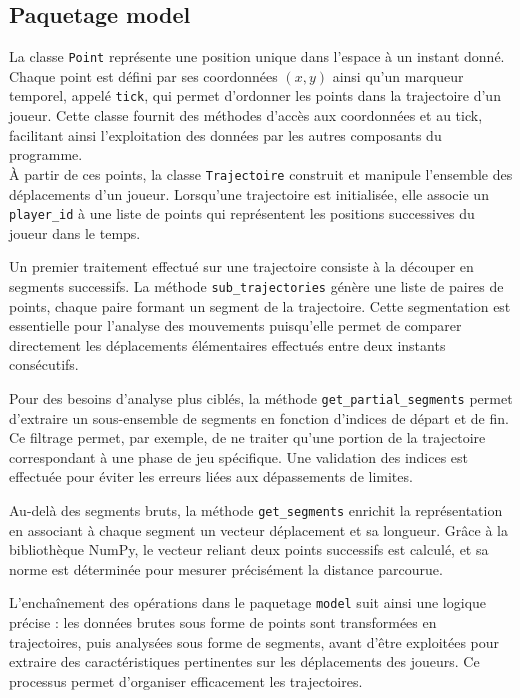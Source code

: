 \documentclass{article}
\begin{document}
       \subsection{Paquetage model}
        La classe \texttt{Point} représente une position unique dans l'espace à un instant donné. Chaque point est défini par ses coordonnées $(x, y)$ ainsi qu’un marqueur temporel, appelé \texttt{tick}, qui permet d’ordonner les points dans la trajectoire d’un joueur. Cette classe fournit des méthodes d'accès aux coordonnées et au tick, facilitant ainsi l’exploitation des données par les autres composants du programme.\\
        
        À partir de ces points, la classe \texttt{Trajectoire} construit et manipule l’ensemble des déplacements d’un joueur. Lorsqu’une trajectoire est initialisée, elle associe un \texttt{player\_id} à une liste de points qui représentent les positions successives du joueur dans le temps.
        
        Un premier traitement effectué sur une trajectoire consiste à la découper en segments successifs. La méthode \texttt{sub\_trajectories} génère une liste de paires de points, chaque paire formant un segment de la trajectoire. Cette segmentation est essentielle pour l’analyse des mouvements puisqu’elle permet de comparer directement les déplacements élémentaires effectués entre deux instants consécutifs.  
        
        Pour des besoins d’analyse plus ciblés, la méthode \texttt{get\_partial\_segments} permet d’extraire un sous-ensemble de segments en fonction d’indices de départ et de fin. Ce filtrage permet, par exemple, de ne traiter qu’une portion de la trajectoire correspondant à une phase de jeu spécifique. Une validation des indices est effectuée pour éviter les erreurs liées aux dépassements de limites.  
        
        Au-delà des segments bruts, la méthode \texttt{get\_segments} enrichit la représentation en associant à chaque segment un vecteur déplacement et sa longueur. Grâce à la bibliothèque NumPy, le vecteur reliant deux points successifs est calculé, et sa norme est déterminée pour mesurer précisément la distance parcourue. 
        
        L’enchaînement des opérations dans le paquetage \texttt{model} suit ainsi une logique précise : les données brutes sous forme de points sont transformées en trajectoires, puis analysées sous forme de segments, avant d’être exploitées pour extraire des caractéristiques pertinentes sur les déplacements des joueurs. Ce processus permet d’organiser efficacement les trajectoires.
        
\end{document}
